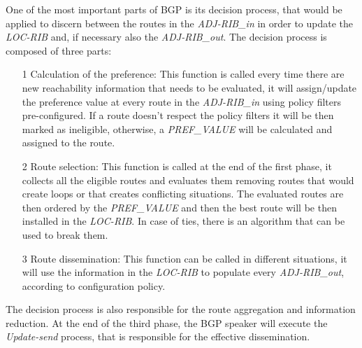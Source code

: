 One of the most important parts of \ac{BGP} is its decision process, that would
be applied to discern between the routes in the \textit{ADJ-RIB\_in} in order
to update the \textit{LOC-RIB} and, if necessary also the \textit{ADJ-RIB\_out}.
The decision process is composed of three parts:
\begin{itemize}
	\item[1] Calculation of the preference: This function is called every time
		there are new reachability information that needs to be evaluated, it
		will assign/update the preference value at every route in the
		\textit{ADJ-RIB\_in} using policy filters pre-configured. If a route
		doesn't respect the policy filters it will be then marked as ineligible,
		otherwise, a \textit{PREF\_VALUE} will be calculated and assigned to the
		route.
	\item[2] Route selection: This function is called at the end of the first
		phase, it collects all the eligible routes and evaluates them removing
		routes that would create loops or that creates conflicting situations.
		The evaluated routes are then ordered by the \textit{PREF\_VALUE} and
		then the best route will be then installed in the \textit{LOC-RIB}.
		In case of ties, there is an algorithm that can be used to break them.
	\item[3] Route dissemination: This function can be called in different
		situations, it will use the information in the \textit{LOC-RIB} to
		populate every \textit{ADJ-RIB\_out}, according to configuration
		policy.
\end{itemize}
The decision process is also responsible for the route aggregation and information
reduction.
At the end of the third phase, the \ac{BGP} speaker will execute the
\textit{Update-send} process, that is responsible for the effective dissemination.

